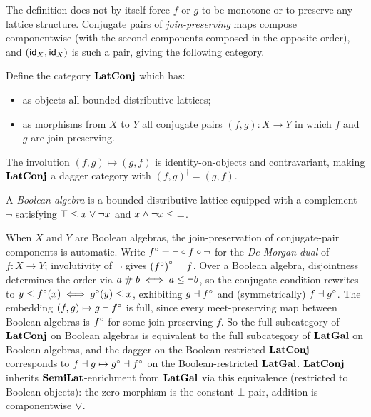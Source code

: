 \noindent The definition does not by itself force $f$ or $g$ to be monotone or to preserve any lattice
structure. Conjugate pairs of \emph{join-preserving} maps compose componentwise (with the second components
composed in the opposite order), and $(\mathsf{id}_X, \mathsf{id}_X)$ is such a pair, giving the following category.

\begin{definition}
Define the category $\mathbf{LatConj}$ which has:
\begin{itemize}
\item as objects all bounded distributive lattices;
\item as morphisms from $X$ to $Y$ all conjugate pairs $(f, g) : X \to Y$ in which $f$ and $g$ are
join-preserving.
\end{itemize}
\end{definition}

\noindent The involution $(f, g) \mapsto (g, f)$ is identity-on-objects and contravariant, making $\mathbf{LatConj}$
a dagger category with $(f, g)^\dagger = (g, f)$.

\begin{definition}
A \emph{Boolean algebra} is a bounded distributive lattice equipped with a complement $\neg$ satisfying
$\top \le x \vee \neg x$ and $x \wedge \neg x \le \bot$.
\end{definition}

\noindent When $X$ and $Y$ are Boolean algebras, the join-preservation of conjugate-pair components is
automatic. Write ${f}^{\circ} = \neg \circ f \circ \neg$ for the \emph{De Morgan dual} of $f : X \to Y$;
involutivity of $\neg$ gives ${({f}^{\circ})}^{\circ} = f$. Over a Boolean algebra, disjointness determines
the order via $a \mathrel{\#} b \iff a \le \neg b$, so the conjugate condition rewrites to $y \le {f}^{\circ}(x)
\iff {g}^{\circ}(y) \le x$, exhibiting $g \dashv {f}^{\circ}$ and (symmetrically) $f \dashv {g}^{\circ}$. The
embedding $(f, g) \mapsto g \dashv {f}^{\circ}$ is full, since every meet-preserving map between Boolean
algebras is ${f}^{\circ}$ for some join-preserving $f$. So the full subcategory of $\mathbf{LatConj}$ on Boolean
algebras is equivalent to the full subcategory of $\mathbf{LatGal}$ on Boolean algebras, and the dagger on the
Boolean-restricted $\mathbf{LatConj}$ corresponds to $f \dashv g \mapsto {g}^{\circ} \dashv {f}^{\circ}$ on the
Boolean-restricted $\mathbf{LatGal}$. $\mathbf{LatConj}$ inherits $\mathbf{SemiLat}$-enrichment from $\mathbf{LatGal}$ via this equivalence
(restricted to Boolean objects): the zero morphism is the constant-$\bot$ pair, addition is componentwise
$\vee$.

